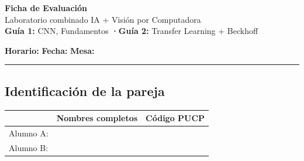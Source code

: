 

\geometry{top=2.5cm, bottom=2.5cm, left=2.2cm, right=2.2cm}




\thispagestyle{fancy}

\begin{center}
{\Large\bfseries Ficha de Evaluación}\\[0.3cm]
{\large Laboratorio combinado IA + Visión por Computadora}\\[0.15cm]
{\large \textbf{Guía 1:} CNN, Fundamentos \quad\textbf{·}\quad \textbf{Guía 2:} Transfer Learning + Beckhoff}
\end{center}

\vspace{0.4cm}

\noindent\textbf{Horario:} \hrulefill\hspace{0.4cm}
\textbf{Fecha:} \hrulefill\hspace{0.4cm}
\textbf{Mesa:} \rule{1.5cm}{0.4pt}

\vspace{0.5cm}

\subsection*{Identificación de la pareja}

\renewcommand{\arraystretch}{1.5}
\begin{tabularx}{\textwidth}{@{}p{2.6cm} X X@{}}
\toprule
 & \textbf{Nombres completos} & \textbf{Código PUCP} \\
\midrule
Alumno A: & & \\
Alumno B: & & \\
\bottomrule
\end{tabularx}
\renewcommand{\arraystretch}{1}

